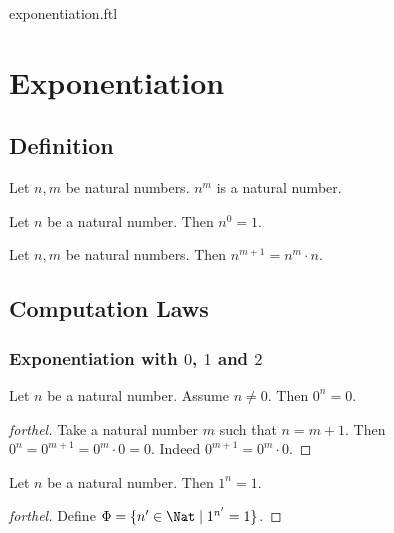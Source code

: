 \documentclass{naproche-library}
\begin{document}
\begin{smodule}{exponentiation.ftl}

  \section*{Exponentiation}

  \subsection*{Definition}

  \begin{signature}[forthel,id=ARITHMETIC_09_3663815629602816,printid]
    Let $n, m$ be natural numbers.
    $n^{m}$ is a natural number.
  \end{signature}

  \begin{axiom}[forthel,id=ARITHMETIC_09_5368818025103360,printid]
    Let $n$ be a natural number.
    Then $n^{0} = 1$.
  \end{axiom}

  \begin{axiom}[forthel,id=ARITHMETIC_09_4140498660884480,printid]
    Let $n, m$ be natural numbers.
    Then $n^{m + 1} = n^{m} \cdot n$.
  \end{axiom}


  \subsection*{Computation Laws}

  \subsubsection*{Exponentiation with $0$, $1$ and $2$}

  \begin{proposition}[forthel,id=ARITHMETIC_09_4673644676513792,printid]
    Let $n$ be a natural number.
    Assume $n \neq 0$.
    Then $0^{n} = 0$.
  \end{proposition}
  \begin{proof}[forthel]
    Take a natural number $m$ such that $n = m + 1$.
    Then $0^{n}
      = 0^{m + 1}
      = 0^{m} \cdot 0
      = 0$.
    Indeed $0^{m + 1} = 0^{m} \cdot 0$.
  \end{proof}

  \begin{proposition}[forthel,id=ARITHMETIC_09_7376849881530368,printid]
    Let $n$ be a natural number.
    Then $1^{n} = 1$.
  \end{proposition}
  \begin{proof}[forthel]
    Define $\Phi = \{ n' \in \Nat \mid 1^{n'} = 1 \}$.


\end{proof}
\end{smodule}
\end{document}
